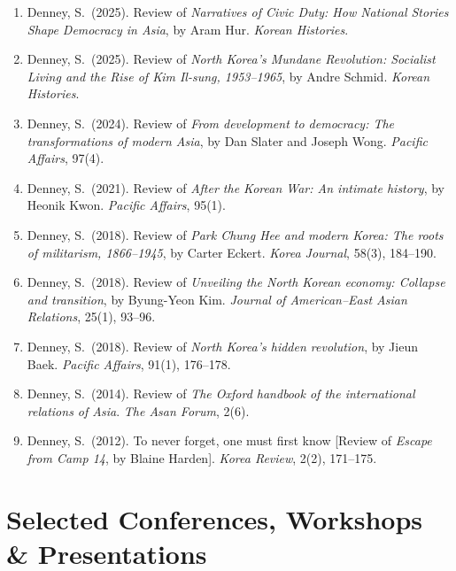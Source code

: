 \documentclass[11pt, a4paper]{article}
\begin{document}
\begin{enumerate}[itemsep=0.15em]
  \item Denney, S.\ (2025). Review of \textit{Narratives of Civic Duty: How National Stories Shape Democracy in Asia}, by Aram Hur. \textit{Korean Histories}.

  \item Denney, S.\ (2025). Review of \textit{North Korea's Mundane Revolution: Socialist Living and the Rise of Kim Il-sung, 1953--1965}, by Andre Schmid. \textit{Korean Histories}.

  \item Denney, S.\ (2024). Review of \textit{From development to democracy: The transformations of modern Asia}, by Dan Slater and Joseph Wong. \textit{Pacific Affairs}, 97(4).

  \item Denney, S.\ (2021). Review of \textit{After the Korean War: An intimate history}, by Heonik Kwon. \textit{Pacific Affairs}, 95(1).

  \item Denney, S.\ (2018). Review of \textit{Park Chung Hee and modern Korea: The roots of militarism, 1866--1945}, by Carter Eckert. \textit{Korea Journal}, 58(3), 184--190.

  \item Denney, S.\ (2018). Review of \textit{Unveiling the North Korean economy: Collapse and transition}, by Byung-Yeon Kim. \textit{Journal of American--East Asian Relations}, 25(1), 93--96.

  \item Denney, S.\ (2018). Review of \textit{North Korea's hidden revolution}, by Jieun Baek. \textit{Pacific Affairs}, 91(1), 176--178.

  \item Denney, S.\ (2014). Review of \textit{The Oxford handbook of the international relations of Asia}. \textit{The Asan Forum}, 2(6).

  \item Denney, S.\ (2012). To never forget, one must first know [Review of \textit{Escape from Camp 14}, by Blaine Harden]. \textit{Korea Review}, 2(2), 171--175.
\end{enumerate}

\section{Selected Conferences, Workshops \& Presentations}
\end{document}

